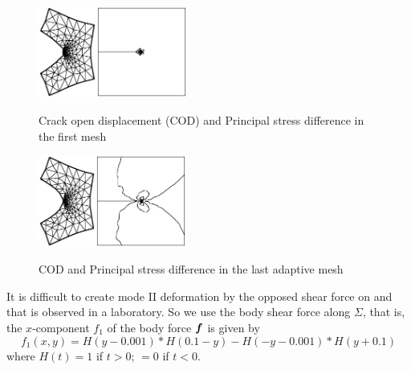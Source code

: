 \documentclass[a4paper,twoside,12pt]{book}
\def\vec#1{\mbox{\boldmath $#1$}}
\begin{document}
\begin{figure}[hbt]
\begin{multicols}{2}
\begin{center}
\includegraphics*[height=3cm]{1stCOD}\includegraphics*[height=3cm]{1stPhoto}
    \caption{\label{1stMode1} Crack open displacement (COD) and Principal stress difference in the first mesh}
\end{center}
\begin{center}
\includegraphics*[height=3cm]{LastCOD}\includegraphics*[height=3cm]{LastPhoto}
    \caption{\label{LastMode1} COD and Principal stress difference in the last adaptive mesh}
\end{center}
\end{multicols}
\end{figure}
It is difficult to create mode II deformation by the opposed shear force
on  and  that is observed in a laboratory.
So we use the body shear force along $\Sigma$, that is, the $x$-component $f_1$
of the body force $\vec f$ is given by
\[
f_1(x,y)=H(y-0.001)*H(0.1-y)-H(-y-0.001)*H(y+0.1)
\]
where $H(t)=1$ if $t>0$; $= 0$ if $t<0$.
\end{document}
